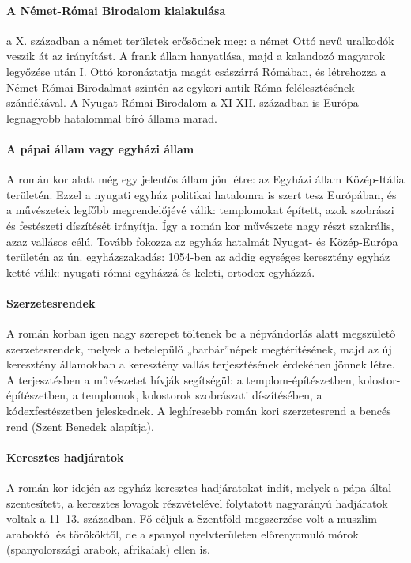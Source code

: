 		\paragraph{A Német-Római Birodalom kialakulása}
		a X. században a német területek erősödnek meg: a német Ottó nevű uralkodók veszik át az irányítást. A frank állam hanyatlása, majd a kalandozó magyarok legyőzése után I. Ottó koronáztatja magát császárrá Rómában, és létrehozza a Német-Római Birodalmat szintén az egykori antik Róma felélesztésének szándékával. A Nyugat-Római Birodalom a XI-XII. században is Európa legnagyobb hatalommal bíró állama marad.
		
		\paragraph{A pápai állam vagy egyházi állam}
		A román kor alatt még egy jelentős állam jön létre: az Egyházi állam Közép-Itália területén. Ezzel a nyugati egyház politikai hatalomra is szert tesz Európában, és a művészetek legfőbb megrendelőjévé válik: templomokat épített, azok szobrászi és festészeti díszítését irányítja. Így a román kor művészete nagy részt szakrális, azaz vallásos célú. Tovább fokozza az egyház hatalmát Nyugat- és Közép-Európa területén az ún. egyházszakadás: 1054-ben az addig egységes keresztény egyház ketté válik: nyugati-római egyházzá és keleti, ortodox egyházzá.
		
		\paragraph{Szerzetesrendek}
		A román korban igen nagy szerepet töltenek be a népvándorlás alatt megszülető szerzetesrendek, melyek a betelepülő „barbár”népek megtérítésének, majd az új keresztény államokban a keresztény vallás terjesztésének érdekében jönnek létre. A terjesztésben a művészetet hívják segítségül: a templom-építészetben, kolostor-építészetben, a templomok, kolostorok szobrászati díszítésében, a kódexfestészetben jeleskednek. A leghíresebb román kori szerzetesrend a bencés rend (Szent Benedek alapítja).
		
		\paragraph{Keresztes hadjáratok}
		A román kor idején az egyház keresztes hadjáratokat indít, melyek a pápa által szentesített, a keresztes lovagok részvételével folytatott nagyarányú hadjáratok voltak a 11–13. században. Fő céljuk a Szentföld megszerzése volt a muszlim araboktól és törököktől, de a spanyol nyelvterületen előrenyomuló mórok (spanyolországi arabok, afrikaiak) ellen is.
		
